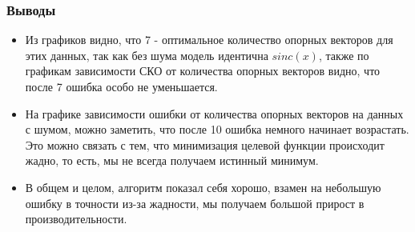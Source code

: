 \documentclass{beamer}
\begin{document}
\begin{frame}
	\frametitle{Выводы}
	\begin{itemize}
		\item Из графиков видно, что 7 - оптимальное количество опорных векторов для
		      этих данных, так как без шума модель идентична $sinc(x)$, также по
		      графикам зависимости СКО от количества опорных векторов видно, что после 7
		      ошибка особо не уменьшается.
		\item На графике зависимости ошибки от количества опорных векторов на
		      данных с шумом, можно заметить, что после 10 ошибка немного начинает
		      возрастать. Это можно связать с тем, что минимизация целевой функции
		      происходит жадно, то есть, мы не всегда получаем истинный минимум.

		\item В общем и целом, алгоритм показал себя хорошо, взамен
		      на небольшую ошибку в точности из-за жадности, мы получаем большой прирост
		      в производительности.

	\end{itemize}

\end{frame}
\end{document}
